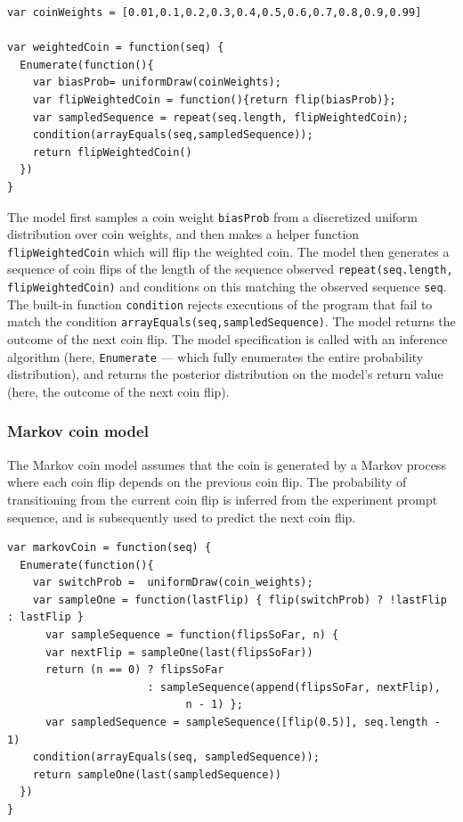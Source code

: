 \documentclass{article}
\begin{document}
\begin{lstlisting}[caption=Biased coin model,  label={lst:m_weighted}]
var coinWeights = [0.01,0.1,0.2,0.3,0.4,0.5,0.6,0.7,0.8,0.9,0.99]

var weightedCoin = function(seq) {
  Enumerate(function(){
    var biasProb= uniformDraw(coinWeights);
    var flipWeightedCoin = function(){return flip(biasProb)};
    var sampledSequence = repeat(seq.length, flipWeightedCoin);
    condition(arrayEquals(seq,sampledSequence));
    return flipWeightedCoin()
  })
}
\end{lstlisting}

%
The model first samples a coin weight \lstinline{biasProb} from a discretized uniform distribution over coin weights, and
then makes a helper function \lstinline{flipWeightedCoin} which will flip the weighted coin.
The model then generates a sequence of coin flips of the length of the sequence observed \lstinline{repeat(seq.length, flipWeightedCoin)} and conditions on this matching the observed sequence \lstinline{seq}.
The built-in function \lstinline{condition} rejects executions of the program that fail to match the condition \lstinline{arrayEquals(seq,sampledSequence)}.
The model returns the outcome of the next coin flip.
The model specification is called with an inference algorithm (here, \lstinline{Enumerate} --- which fully enumerates the entire probability distribution), and returns the posterior distribution on the model's return value (here, the outcome of the next coin flip).

\subsubsection{Markov coin model}
\label{s:tutorial:sss:markov}
The Markov coin model assumes that the coin is generated by a Markov process where each coin flip depends on the previous coin flip. The probability of transitioning from the current coin flip is inferred from the experiment prompt sequence, and is subsequently used to predict the next coin flip.

\begin{lstlisting}[caption=Markov coin model]
var markovCoin = function(seq) {
  Enumerate(function(){
    var switchProb =  uniformDraw(coin_weights);
    var sampleOne = function(lastFlip) { flip(switchProb) ? !lastFlip : lastFlip }
 	  var sampleSequence = function(flipsSoFar, n) {
      var nextFlip = sampleOne(last(flipsSoFar))
      return (n == 0) ? flipsSoFar
                      : sampleSequence(append(flipsSoFar, nextFlip),
                      		n - 1) };
	  var sampledSequence = sampleSequence([flip(0.5)], seq.length - 1)
    condition(arrayEquals(seq, sampledSequence));
    return sampleOne(last(sampledSequence))
  })
}
\end{lstlisting}
\end{document}
